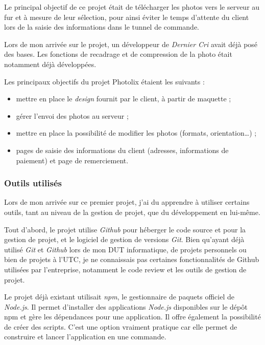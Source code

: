 \documentclass[12pt,a4paper]{article}
\providecommand{\tightlist}{%
  \setlength{\itemsep}{0pt}\setlength{\parskip}{0pt}}
\begin{document}
  Le principal objectif de ce projet était de télécharger les photos vers
  le serveur au fur et à mesure de leur sélection, pour ainsi éviter le
  temps d'attente du client lors de la saisie des informations dans le
  tunnel de commande.

  \bigskip

  Lors de mon arrivée sur le projet, un développeur de \emph{Dernier Cri}
  avait déjà posé des bases. Les fonctions de recadrage et de compression
  de la photo était notamment déjà développées.

  \bigskip

  Les principaux objectifs du projet Photolix étaient les suivants :

  \begin{itemize}
  \tightlist
  \item
    mettre en place le \emph{design} fournit par le client, à partir de
    maquette ;
  \item
    gérer l'envoi des photos au serveur ;
  \item
    mettre en place la possibilité de modifier les photos (formats,
    orientation\ldots{}) ;
  \item
    pages de saisie des informations du client (adresses, informations de
    paiement) et page de remerciement.
  \end{itemize}

  \bigskip

  \subsubsection{Outils utilisés}\label{outils-utilisuxe9s}

  \bigskip

  Lors de mon arrivée sur ce premier projet, j'ai du apprendre à utiliser
  certains outils, tant au niveau de la gestion de projet, que du
  développement en lui-même.

  \bigskip

  Tout d'abord, le projet utilise \emph{Github} pour héberger le code
  source et pour la gestion de projet, et le logiciel de gestion de
  versions \emph{Git}. Bien qu'ayant déjà utilisé \emph{Git} et
  \emph{Github} lors de mon DUT informatique, de projets personnels ou
  bien de projets à l'UTC, je ne connaissais pas certaines fonctionnalités
  de Github utilisées par l'entreprise, notamment le code review et les
  outils de gestion de projet.

  \bigskip

  Le projet déjà existant utilisait \emph{npm}, le gestionnaire de paquets
  officiel de \emph{Node.js}. Il permet d'installer des applications
  \emph{Node.js} disponibles sur le dépôt npm et gère les dépendances pour
  une application. Il offre également la possibilité de créer des scripts.
  C'est une option vraiment pratique car elle permet de construire et
  lancer l'application en une commande.
\end{document}
